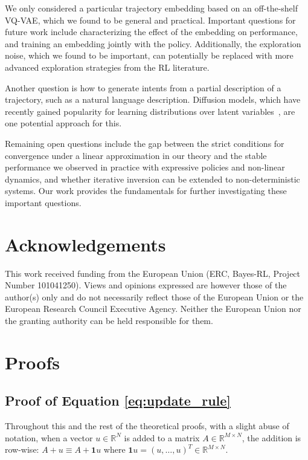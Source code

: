 \documentclass[nohyperref]{article}
\begin{document}
We only considered a particular trajectory embedding based on an off-the-shelf VQ-VAE, which we found to be general and practical. Important questions for future work include characterizing the effect of the embedding on performance, and training an embedding jointly with the policy. Additionally, the exploration noise, which we found to be important, can potentially be replaced with more advanced exploration strategies from the RL literature.


Another question is how to generate intents from a partial description of a trajectory, such as a natural language description. Diffusion models, which have recently gained popularity for learning distributions over latent variables~\citep{rombach2021highresolution}, are one potential approach for this.


Remaining open questions include the gap between the strict conditions for convergence under a linear approximation in our theory and the stable performance we observed in practice with expressive policies and non-linear dynamics, and whether iterative inversion can be extended to non-deterministic systems. Our work provides the fundamentals for further investigating these important questions.

\section*{Acknowledgements}
This work received funding from the European Union (ERC, Bayes-RL, Project Number 101041250). Views and opinions expressed are however those of the author(s) only and do not necessarily reflect those of the European Union or the European Research Council Executive Agency. Neither the European Union nor the granting authority can be held responsible for them. 





\newpage
\appendix
\onecolumn



\section{Proofs}
\subsection{Proof of Equation \ref{eq:update_rule}}\label{app:update_rule}
Throughout this and the rest of the theoretical proofs, with a slight abuse of notation, when a vector $u\in\mathbb{R}^N$ is added to a matrix $A\in\mathbb{R}^{M\times N}$, the addition is row-wise: $A+u\equiv A+\mathbf{1}u$ where $\mathbf{1}u=(u,\dots,u)^T\in\mathbb{R}^{M\times N}$.\\
\end{document}
